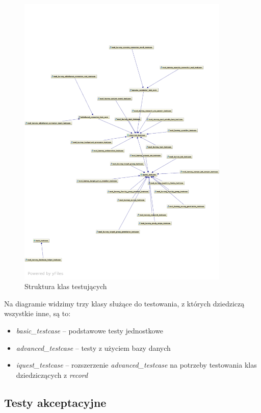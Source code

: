 \begin{figure}[H]
\begin{center}
\includegraphics[width=0.9\textwidth]{figures/lw/tests.pdf} 
\end{center}
\caption{Struktura klas testujących}
\label{fig:tests}
\end{figure}

Na diagramie widzimy trzy klasy służące do testowania, z których dziedziczą wszystkie inne, są to:
\begin{itemize}
\item \emph{basic\_testcase} -- podstawowe testy jednostkowe
\item \emph{advanced\_testcase} -- testy z użyciem bazy danych
\item \emph{iquest\_testcase} -- rozszerzenie \emph{advanced\_testcase} na potrzeby testowania klas dziedziczących z \emph{record}
\end{itemize}

\subsection{Testy akceptacyjne}
\label{Chapter713}

